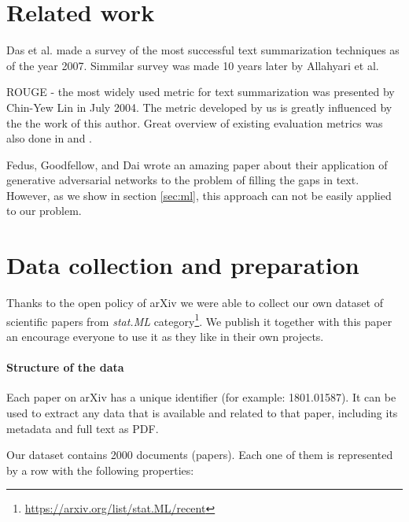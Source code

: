 \documentclass[sigplan]{acmart}
\begin{document}

\section{Related work}

Das et al. made a survey of the most successful text summarization techniques as of the year 2007\cite{das-7}. Simmilar survey was made 10 years later by Allahyari et al\cite{allahyari-17}.

ROUGE - the most widely used metric for text summarization was presented by Chin-Yew Lin in July 2004\cite{lin-4}. The metric developed by us is greatly influenced by the the work of this author. Great overview of existing evaluation metrics was also done in \cite{das-7} and \cite{allahyari-17}.

Fedus, Goodfellow, and Dai\cite{fedus-18} wrote an amazing paper about their application of generative adversarial networks to the problem of filling the gaps in text. However, as we show in section \ref{sec:ml}, this approach can not be easily applied to our problem.

\section{Data collection and preparation}
\label{sec:data}

Thanks to the open policy of arXiv we were able to collect our own dataset of scientific papers from \textit{stat.ML} category\footnote{\url{https://arxiv.org/list/stat.ML/recent}}. We publish it together with this paper an encourage everyone to use it as they like in their own projects.

\paragraph{Structure of the data} Each paper on arXiv has a unique identifier (for example: 1801.01587). It can be used to extract any data that is available and related to that paper, including its metadata and full text as PDF.

Our dataset contains 2000 documents (papers). Each one of them is represented by a row with the following properties:
\end{document}
